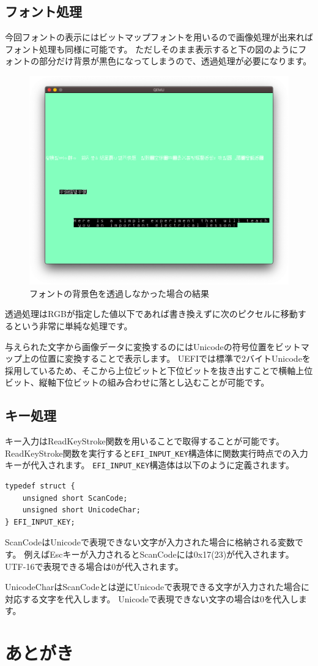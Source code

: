 \documentclass[10pt, b5paper, openany]{ltjsbook}
\begin{document}
\section{フォント処理}
今回フォントの表示にはビットマップフォントを用いるので画像処理が出来ればフォント処理も同様に可能です。
ただしそのまま表示すると下の図のようにフォントの部分だけ背景が黒色になってしまうので、透過処理が必要になります。
\begin{figure}[H]
    \centering
    \includegraphics[scale=0.25]{pic/font_with_backblack.png}
    \caption{フォントの背景色を透過しなかった場合の結果}
    \label{fig:font_with_backblack}
\end{figure}
透過処理はRGBが指定した値以下であれば書き換えずに次のピクセルに移動するという非常に単純な処理です。

与えられた文字から画像データに変換するのにはUnicodeの符号位置をビットマップ上の位置に変換することで表示します。
UEFIでは標準で2バイトUnicodeを採用しているため、そこから上位ビットと下位ビットを抜き出すことで横軸上位ビット、縦軸下位ビットの組み合わせに落とし込むことが可能です。

\section{キー処理}
キー入力はReadKeyStroke関数を用いることで取得することが可能です。
ReadKeyStroke関数を実行すると\verb+EFI_INPUT_KEY+構造体に関数実行時点での入力キーが代入されます。
\verb+EFI_INPUT_KEY+構造体は以下のように定義されます。
\begin{lstlisting}[caption=EFI\_INPUT\_KEY,label=efi_input_key]
typedef struct {
    unsigned short ScanCode;
    unsigned short UnicodeChar;
} EFI_INPUT_KEY;
\end{lstlisting}
ScanCodeはUnicodeで表現できない文字が入力された場合に格納される変数です。
例えばEscキーが入力されるとScanCodeには0x17(23)が代入されます。
UTF-16で表現できる場合は0が代入されます。

UnicodeCharはScanCodeとは逆にUnicodeで表現できる文字が入力された場合に対応する文字を代入します。
Unicodeで表現できない文字の場合は0を代入します。

\chapter{あとがき}
\end{document}
